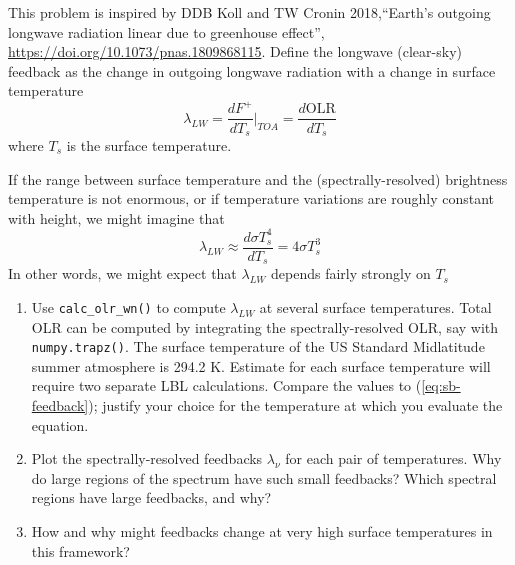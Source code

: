 \documentclass{article}
\begin{document}
This problem is inspired by DDB Koll and TW Cronin 2018,``Earth’s outgoing longwave radiation linear due to  greenhouse effect'', \url{https://doi.org/10.1073/pnas.1809868115}. Define the longwave (clear-sky) feedback as the change in outgoing longwave radiation with a change in surface temperature 
\begin{equation}
\lambda_{LW} = \frac{d F^+}{d T_{s}}\bigg|_{TOA} = \frac{d \textrm{OLR}}{d T_{s}}
\end{equation}
where $T_s$ is the surface temperature. 

If the range between surface temperature and the (spectrally-resolved) brightness temperature  is not enormous, or if temperature variations are roughly constant with height, we might  imagine that 
\begin{equation}
\label{eq:sb-feedback}
\lambda_{LW} \approx  \frac{d  \sigma T_s^4}{d T_{s}} = 4 \sigma T_s^3
\end{equation}
In other words, we might expect that $\lambda_{LW}$ depends fairly strongly on $T_s$

\begin{enumerate}
\item Use {\tt calc\_olr\_wn()} to compute $\lambda_{LW}$ at several surface temperatures. Total OLR can be computed by integrating the spectrally-resolved OLR, say with {\tt numpy.trapz()}. The surface temperature of the US Standard Midlatitude summer atmosphere is 294.2 \si{\kelvin}. Estimate for each surface temperature will require two separate LBL calculations. Compare the values to  (\ref{eq:sb-feedback}); justify your choice for the temperature at which you evaluate the equation. 
\item Plot the spectrally-resolved feedbacks $\lambda_{\nu}$ for each pair of temperatures. Why do large regions of the spectrum have such small feedbacks? Which spectral regions have large feedbacks, and why?  
\item How and why might feedbacks change at very high surface temperatures in this framework? 
\end{enumerate} 
\end{document}
